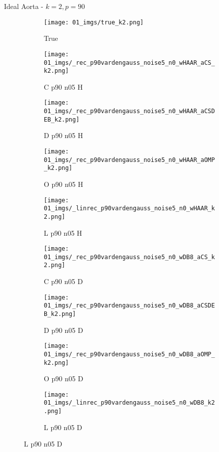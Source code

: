 \begin{frame}{Ideal Aorta - $k=2,p=90$}{}
\begin{figure}
\begin{subfigure}{0.1\textwidth}
\texttt{[image: 01\_imgs/true\_k2.png]}
\caption*{\Tiny True}
\end{subfigure}
\begin{subfigure}{0.1\textwidth}
\texttt{[image: 01\_imgs/\_rec\_p90vardengauss\_noise5\_n0\_wHAAR\_aCS\_k2.png]}
\caption*{\Tiny C p90 n05 H}
\end{subfigure}
\begin{subfigure}{0.1\textwidth}
\texttt{[image: 01\_imgs/\_rec\_p90vardengauss\_noise5\_n0\_wHAAR\_aCSDEB\_k2.png]}
\caption*{\Tiny D p90 n05 H}
\end{subfigure}
\begin{subfigure}{0.1\textwidth}
\texttt{[image: 01\_imgs/\_rec\_p90vardengauss\_noise5\_n0\_wHAAR\_aOMP\_k2.png]}
\caption*{\Tiny O p90 n05 H}
\end{subfigure}
\begin{subfigure}{0.1\textwidth}
\texttt{[image: 01\_imgs/\_linrec\_p90vardengauss\_noise5\_n0\_wHAAR\_k2.png]}
\caption*{\Tiny L p90 n05 H}
\end{subfigure}
\begin{subfigure}{0.1\textwidth}
\texttt{[image: 01\_imgs/\_rec\_p90vardengauss\_noise5\_n0\_wDB8\_aCS\_k2.png]}
\caption*{\Tiny C p90 n05 D}
\end{subfigure}
\begin{subfigure}{0.1\textwidth}
\texttt{[image: 01\_imgs/\_rec\_p90vardengauss\_noise5\_n0\_wDB8\_aCSDEB\_k2.png]}
\caption*{\Tiny D p90 n05 D}
\end{subfigure}
\begin{subfigure}{0.1\textwidth}
\texttt{[image: 01\_imgs/\_rec\_p90vardengauss\_noise5\_n0\_wDB8\_aOMP\_k2.png]}
\caption*{\Tiny O p90 n05 D}
\end{subfigure}
\begin{subfigure}{0.1\textwidth}
\texttt{[image: 01\_imgs/\_linrec\_p90vardengauss\_noise5\_n0\_wDB8\_k2.png]}
\caption*{\Tiny L p90 n05 D}
\end{subfigure}

\vspace{5pt}


\end{figure}
\end{frame}
